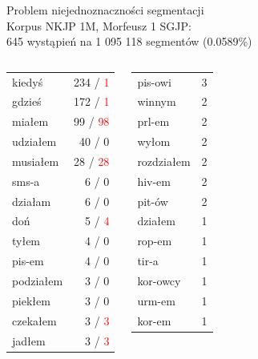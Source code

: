 \documentclass{beamer}
\newcommand{\markerr}[1]{\textcolor{red}{#1}}
\begin{document}
\begin{frame}{Problem niejednoznaczności segmentacji}
  \\
  Korpus NKJP 1M, Morfeusz 1 SGJP:\\
  645 wystąpień na 1 095 118 segmentów (0.0589\%)
  \begin{columns}[c]
    \begin{center}
      \footnotesize
      \begin{tabular}{l|r}
      kiedyś & 234 / \markerr{1} \\
      gdzieś & 172 / \markerr{1} \\
      miałem & 99 / \markerr{98} \\
      udziałem & 40 / 0 \\
      musiałem & 28 / \markerr{28} \\
      sms-a & 6 / 0 \\
      działam & 6 / 0\\
      doń & 5 / \markerr{4} \\
      tyłem & 4 / 0 \\
      pis-em & 4 / 0 \\
      podziałem & 3 / 0 \\
      piekłem & 3 / 0 \\
      czekałem & 3 / \markerr{3} \\
      jadłem & 3 / \markerr{3} \\
      \end{tabular}
    \end{center}
    \begin{center}
      \footnotesize
      \begin{tabular}{l|r}
        pis-owi & 3 \\
        winnym & 2 \\
        prl-em & 2 \\
        wyłom & 2 \\
        rozdziałem & 2 \\
        hiv-em & 2 \\
        pit-ów & 2 \\
        działem & 1 \\
        rop-em & 1 \\
        tir-a & 1 \\
        kor-owcy & 1 \\
        urm-em & 1 \\
        kor-em & 1 \\

\end{tabular}
\end{center}
\end{columns}
\end{frame}
\end{document}
